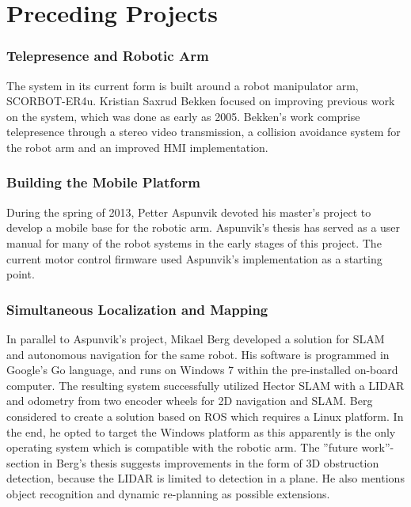 \section{Preceding Projects}

\subsubsection{Telepresence and Robotic Arm}

The system in its current form is built around a robot manipulator arm, SCORBOT-ER4u. Kristian Saxrud Bekken focused on improving previous work on the system, which was done as early as 2005\cite{bekken}. Bekken's work comprise telepresence through a stereo video transmission, a collision avoidance system for the robot arm and an improved \ac{HMI} implementation.

\subsubsection{Building the Mobile Platform}
During the spring of 2013, Petter Aspunvik devoted his master's project to develop a mobile base for the robotic arm\cite{aspunvik}. Aspunvik's thesis has served as a user manual for many of the robot systems in the early stages of this project. The current motor control firmware used Aspunvik's implementation as a starting point.

\subsubsection{Simultaneous Localization and Mapping}

In parallel to Aspunvik's project, Mikael Berg developed a solution for \ac{SLAM} and autonomous navigation for the same robot\cite{berg}. His software is programmed in Google's Go language, and runs on Windows 7 within the pre-installed on-board computer. The resulting system successfully utilized Hector SLAM with a LIDAR and odometry from two encoder wheels for 2D navigation and \ac{SLAM}. Berg considered to create a solution based on \ac{ROS} which requires a Linux platform. In the end, he opted to target the Windows platform as this apparently is the only operating system which is compatible with the robotic arm. The ''future work''-section in Berg's thesis suggests improvements in the form of 3D obstruction detection, because the LIDAR is limited to detection in a plane. He also mentions object recognition and dynamic re-planning as possible extensions. 


